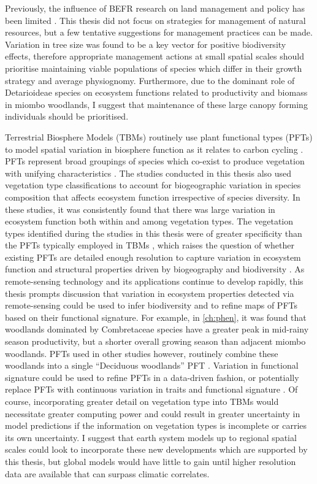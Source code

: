 \begin{refsection}
Previously, the influence of BEFR research on land management and policy has been limited \citep{Manning2019}. This thesis did not focus on strategies for management of natural resources, but a few tentative suggestions for management practices can be made. Variation in tree size was found to be a key vector for positive biodiversity effects, therefore appropriate management actions at small spatial scales should prioritise maintaining viable populations of species which differ in their growth strategy and average physiognomy. Furthermore, due to the dominant role of Detarioideae species on ecosystem functions related to productivity and biomass in miombo woodlands, I suggest that maintenance of these large canopy forming individuals should be prioritised.

Terrestrial Biosphere Models (TBMs) routinely use plant functional types (PFTs) to model spatial variation in biosphere function as it relates to carbon cycling \citep{Fisher2014}. PFTs represent broad groupings of species which co-exist to produce vegetation with unifying characteristics \citep{Bonan2002}. The studies conducted in this thesis also used vegetation type classifications to account for biogeographic variation in species composition that affects ecosystem function irrespective of species diversity. In these studies, it was consistently found that there was large variation in ecosystem function both within and among vegetation types. The vegetation types identified during the studies in this thesis were of greater specificity than the PFTs typically employed in TBMs \citep{Ustin2010, Krinner2005}, which raises the question of whether existing PFTs are detailed enough resolution to capture variation in ecosystem function and structural properties driven by biogeography and biodiversity \citep{Osborne2018, Torello2013}. As remote-sensing technology and its applications continue to develop rapidly, this thesis prompts discussion that variation in ecosystem properties detected via remote-sensing could be used to infer biodiversity and to refine maps of PFTs based on their functional signature. For example, in \autoref{ch:phen}, it was found that woodlands dominated by Combretaceae species have a greater peak in mid-rainy season productivity, but a shorter overall growing season than adjacent miombo woodlands. PFTs used in other studies however, routinely combine these woodlands into a single ``Deciduous woodlands'' PFT \citep{Krinner2005}. Variation in functional signature could be used to refine PFTs in a data-driven fashion, or potentially replace PFTs with continuous variation in traits and functional signature \citep{Peaucelle2019}. Of course, incorporating greater detail on vegetation type into TBMs would necessitate greater computing power and could result in greater uncertainty in model predictions if the information on vegetation types is incomplete or carries its own uncertainty. I suggest that earth system models up to regional spatial scales could look to incorporate these new developments which are supported by this thesis, but global models would have little to gain until higher resolution data are available that can surpass climatic correlates.


\end{refsection}
